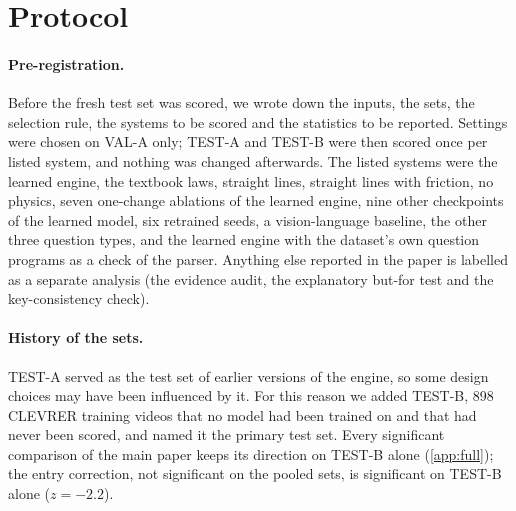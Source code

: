 \providecommand{\sys}{CausalVis}
\providecommand{\etal}{et al.}
\renewcommand{\thesection}{\Alph{section}}
\renewcommand{\thetable}{S\arabic{table}}
\renewcommand{\thefigure}{S\arabic{figure}}
\setcounter{section}{0}
\setcounter{table}{0}
\setcounter{figure}{0}

\section{Protocol}
\label{app:prereg}

\paragraph{Pre-registration.}
Before the fresh test set was scored, we wrote down the inputs, the sets, the selection rule, the systems to be scored and the statistics to be reported.
Settings were chosen on VAL-A only; TEST-A and TEST-B were then scored once per listed system, and nothing was changed afterwards.
The listed systems were the learned engine, the textbook laws, straight lines, straight lines with friction, no physics, seven one-change ablations of the learned engine, nine other checkpoints of the learned model, six retrained seeds, a vision-language baseline, the other three question types, and the learned engine with the dataset's own question programs as a check of the parser.
Anything else reported in the paper is labelled as a separate analysis (the evidence audit, the explanatory but-for test and the key-consistency check).

\paragraph{History of the sets.}
TEST-A served as the test set of earlier versions of the engine, so some design choices may have been influenced by it.
For this reason we added TEST-B, 898 CLEVRER training videos that no model had been trained on and that had never been scored, and named it the primary test set.
Every significant comparison of the main paper keeps its direction on TEST-B alone (\cref{app:full}); the entry correction, not significant on the pooled sets, is significant on TEST-B alone ($z=-2.2$).

